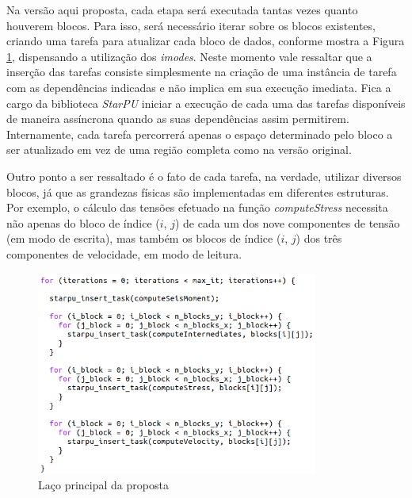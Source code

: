 \documentclass[cic,tc]{iiufrgs}
\begin{document}
Na versão aqui proposta, cada etapa será executada tantas vezes quanto houverem blocos. Para isso, será necessário iterar sobre os blocos existentes, criando uma tarefa para atualizar cada bloco
de dados, conforme mostra a Figura \ref{fig:new_main_loop}, dispensando a utilização dos \textit{imodes}. Neste momento vale ressaltar que a inserção das tarefas consiste
simplesmente na criação de uma instância de tarefa com as dependências indicadas e não implica em sua execução imediata. Fica a cargo da biblioteca \textit{StarPU} iniciar a execução
de cada uma das tarefas disponíveis de maneira assíncrona quando as suas dependências assim permitirem. Internamente, cada tarefa percorrerá apenas o espaço determinado pelo bloco a ser
atualizado em vez de uma região completa como na versão original.

Outro ponto a ser ressaltado é o fato de cada tarefa, na verdade, utilizar diversos blocos, já que as grandezas físicas são implementadas em diferentes estruturas. Por exemplo, o cálculo das
tensões efetuado na função \textit{computeStress} necessita não apenas do bloco de índice ($i$, $j$) de cada um dos nove componentes de tensão (em modo de escrita), mas também os blocos de
índice ($i$, $j$) dos três componentes de velocidade, em modo de leitura.

\begin{figure}[!htb]
    \caption{Laço principal da proposta}
    \begin{center}
      \includegraphics[width=25em]{new_main_loop}
    \end{center}
    \label{fig:new_main_loop}
\end{figure}
\end{document}
